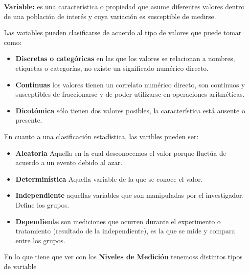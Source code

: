 \documentclass[a4paper]{report} %
\begin{document}
\textbf{Variable:} es una caracter\'istica o propiedad que asume diferentes valores dentro de una poblaci\'on de inter\'es y cuya variaci\'on es susceptible de medirse.

Las variables pueden clasificarse de acuerdo al tipo de valores que puede tomar como:

\begin{itemize}
\item \textbf{Discretas o categ\'oricas} en las que los valores se relacionan a nombres, etiquetas o categor\'ias, no existe un significado num\'erico directo.
\item \textbf{Continuas} los valores tienen un correlato num\'erico directo, son continuos y susceptibles de fraccionarse y de poder utilizarse en operaciones aritm\'eticas.
\item \textbf{Dicot\'omica} s\'olo tienen dos valores posibles, la caracter\'istica est\'a ausente o presente.
\end{itemize}

En cuanto a una clasificaci\'on estad\'istica, las varibles pueden ser:

\begin{itemize}
\item \textbf{Aleatoria} Aquella en la cual desconocemos el valor porque fluct\'ua de acuerdo a un evento debido al azar.
\item \textbf{Determin\'istica} Aquella variable de la que se conoce el valor.
\item \textbf{Independiente} aquellas variables que son manipuladas por el investigador. Define los grupos.
\item \textbf{Dependiente} son mediciones que ocurren durante el experimento o tratamiento (resultado de la independiente), es la que se mide y compara entre los grupos.
\end{itemize}

En lo que tiene que ver con los \textbf{Niveles de Medici\'on} tenemoss distintos tipos de variable
\end{document}
